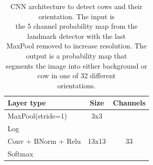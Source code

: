 \documentclass{cta-author}
\begin{document}
\begin{table}
\begin{center}
\begin{tabular}{|l|c|c|}
\hline
\textbf{Layer type} & \textbf{Size} & \textbf{Channels} \\
\hline

MaxPool(stride=1) & 3x3 &  \\
Log & & \\
Conv + BNorm + Relu & 13x13 & 33 \\
Softmax & & \\
\hline
\end{tabular}
\end{center}
\caption{CNN architecture to detect
cows and their orientation. The input is \\
the 5 channel probability map from the landmark detector with the last \\
MaxPool removed to increase resolution. The output is a probability map that \\
segments the image into either background or cow in one of 32 different \\
orientations.
}
\label{tab:cowdirnet}
\end{table}
\end{document}
